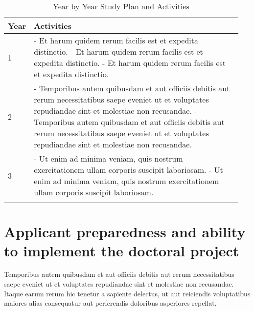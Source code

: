 \documentclass[12pt]{extarticle}
\begin{document}
\begin{longtable}[H]{|p{0.05\linewidth}|p{0.9\linewidth}|}
    \hline
    Year & Activities\\
    \hline
   1 & - Et harum quidem rerum facilis est et expedita distinctio.  \newline
   - Et harum quidem rerum facilis est et expedita distinctio. \newline
   - Et harum quidem rerum facilis est et expedita distinctio. \\ 
    \hline
    \hline
   2 & - Temporibus autem quibusdam et aut officiis debitis aut rerum necessitatibus saepe eveniet ut et voluptates repudiandae sint et molestiae non recusandae. \newline
   - Temporibus autem quibusdam et aut officiis debitis aut rerum necessitatibus saepe eveniet ut et voluptates repudiandae sint et molestiae non recusandae.\\ 
    \hline
    \hline
   3 & - Ut enim ad minima veniam, quis nostrum exercitationem ullam corporis suscipit laboriosam. \newline
   - Ut enim ad minima veniam, quis nostrum exercitationem ullam corporis suscipit laboriosam. \\ 
    \hline
    
\caption{Year by Year Study Plan and Activities} \label{tab:yearplan}
\end{longtable}

\section{Applicant preparedness and ability to implement the doctoral project}
Temporibus autem quibusdam et aut officiis debitis aut rerum necessitatibus saepe eveniet ut et voluptates repudiandae sint et molestiae non recusandae. Itaque earum rerum hic tenetur a sapiente delectus, ut aut reiciendis voluptatibus maiores alias consequatur aut perferendis doloribus asperiores repellat.



\end{document}
